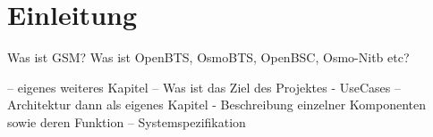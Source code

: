 \section{Einleitung}
Was ist GSM?
Was ist OpenBTS, OsmoBTS, OpenBSC, Osmo-Nitb etc?

-- eigenes weiteres Kapitel
-- Was ist das Ziel des Projektes - UseCases \newline
-- Architektur dann als eigenes Kapitel - Beschreibung einzelner Komponenten sowie deren Funktion\newline
-- Systemspezifikation \newline